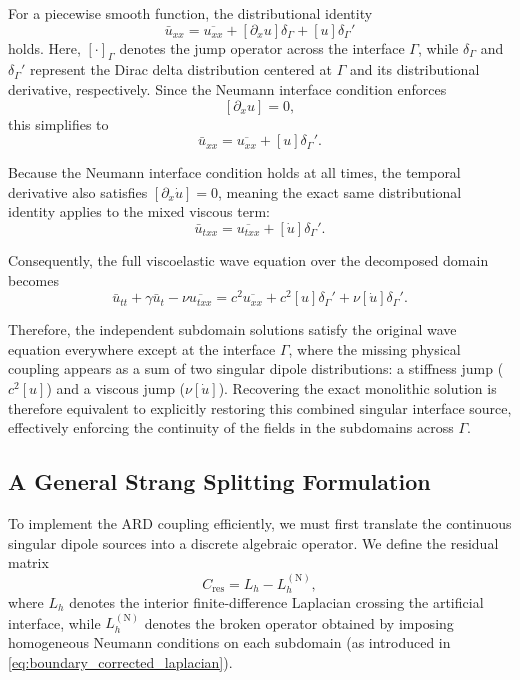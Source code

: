 \documentclass{Configuration_Files/PoliMi3i_thesis}
\begin{document}
For a piecewise smooth function, the distributional identity
\[
\bar u_{xx}
=
\overline{u_{xx}}
+
[\partial_xu]\delta_\Gamma
+
[u]\delta_\Gamma'
\]
holds. Here, $[\cdot]_\Gamma$ denotes the jump operator across the interface $\Gamma$, while $\delta_\Gamma$ and $\delta_\Gamma'$ represent the Dirac delta distribution centered at $\Gamma$ and its distributional derivative, respectively. Since the Neumann interface condition enforces
\[
[\partial_xu]=0,
\]
this simplifies to
\begin{equation}
\bar u_{xx}
=
\overline{u_{xx}}
+
[u]\delta_\Gamma'.
\label{eq:dist_deriv}
\end{equation}

Because the Neumann interface condition holds at all times, the temporal derivative also satisfies $[\partial_x\dot u]=0$, meaning the exact same distributional identity applies to the mixed viscous term:
\begin{equation*}
\bar u_{txx}
=
\overline{u_{txx}}
+
[\dot u]\delta_\Gamma'.
\end{equation*}

Consequently, the full viscoelastic wave equation over the decomposed domain becomes
\begin{equation*}
\bar u_{tt}
+
\gamma\bar u_t
-
\nu\overline{u_{txx}}
=
c^2\overline{u_{xx}}
+
c^2[u]\delta_\Gamma'
+
\nu[\dot u]\delta_\Gamma'.
\end{equation*}

Therefore, the independent subdomain solutions satisfy the original wave equation everywhere except at the interface $\Gamma$, where the missing physical coupling appears as a sum of two singular dipole distributions: a stiffness jump ($c^2[u]$) and a viscous jump ($\nu[\dot u]$). Recovering the exact monolithic solution is therefore equivalent to explicitly restoring this combined singular interface source, effectively enforcing the continuity of the fields in the subdomains across $\Gamma$.

\subsection{A General Strang Splitting Formulation}

To implement the ARD coupling efficiently, we must first translate the continuous singular dipole sources into a discrete algebraic operator. We define the residual matrix
\begin{equation*}
C_{\mathrm{res}}
=
L_h
-
L_h^{(\mathrm N)},
\end{equation*}
where $L_h$ denotes the interior finite-difference Laplacian crossing the artificial interface, while $L_h^{(\mathrm N)}$ denotes the broken operator obtained by imposing homogeneous Neumann conditions on each subdomain (as introduced in \eqref{eq:boundary_corrected_laplacian}).
\end{document}
